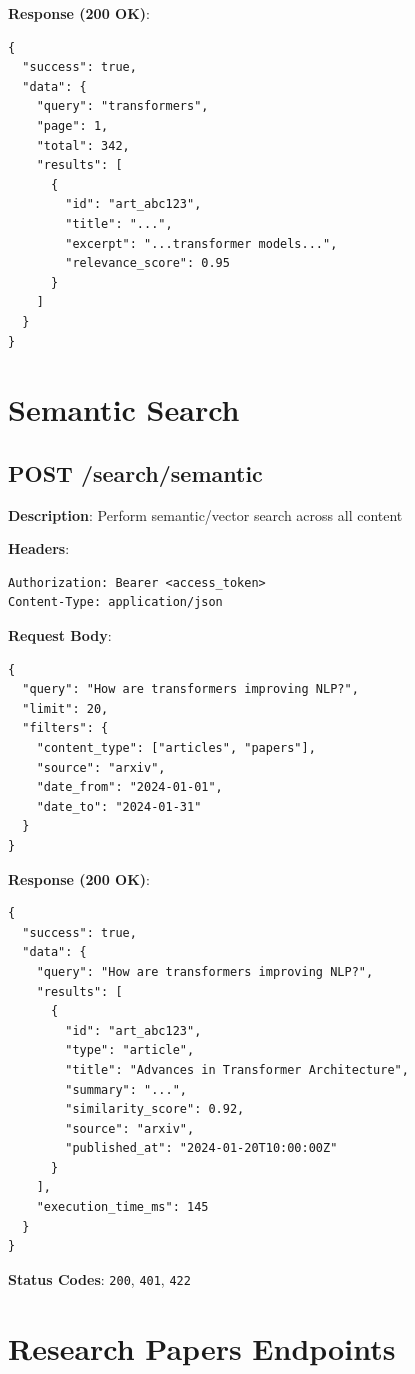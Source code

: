 \documentclass[12pt,a4paper]{report}
\begin{document}
\textbf{Response (200 OK)}:
\begin{lstlisting}
{
  "success": true,
  "data": {
    "query": "transformers",
    "page": 1,
    "total": 342,
    "results": [
      {
        "id": "art_abc123",
        "title": "...",
        "excerpt": "...transformer models...",
        "relevance_score": 0.95
      }
    ]
  }
}
\end{lstlisting}

\chapter{Semantic Search}

\section{POST /search/semantic}

\textbf{Description}: Perform semantic/vector search across all content

\textbf{Headers}:
\begin{lstlisting}
Authorization: Bearer <access_token>
Content-Type: application/json
\end{lstlisting}

\textbf{Request Body}:
\begin{lstlisting}
{
  "query": "How are transformers improving NLP?",
  "limit": 20,
  "filters": {
    "content_type": ["articles", "papers"],
    "source": "arxiv",
    "date_from": "2024-01-01",
    "date_to": "2024-01-31"
  }
}
\end{lstlisting}

\textbf{Response (200 OK)}:
\begin{lstlisting}
{
  "success": true,
  "data": {
    "query": "How are transformers improving NLP?",
    "results": [
      {
        "id": "art_abc123",
        "type": "article",
        "title": "Advances in Transformer Architecture",
        "summary": "...",
        "similarity_score": 0.92,
        "source": "arxiv",
        "published_at": "2024-01-20T10:00:00Z"
      }
    ],
    "execution_time_ms": 145
  }
}
\end{lstlisting}

\textbf{Status Codes}: \texttt{200}, \texttt{401}, \texttt{422}


\chapter{Research Papers Endpoints}
\end{document}
